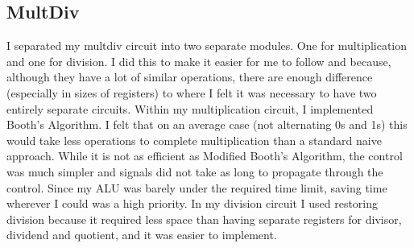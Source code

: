 \documentclass[letterpaper]{article} %
\begin{document}
\subsection*{MultDiv}
I separated my multdiv circuit into two separate modules. One for multiplication and one for division. I did this to make it easier for me to follow and because, although they have a lot of similar operations, there are enough difference (especially in sizes of registers) to where I felt it was necessary to have two entirely separate circuits. Within my multiplication circuit, I implemented Booth's Algorithm. I felt that on an average case (not alternating 0s and 1s) this would take less operations to complete  multiplication than a standard naive approach. While it is not as efficient as Modified Booth's Algorithm, the control was much simpler and signals did not take as long to propagate through the control. Since my ALU was barely under the required time limit, saving time wherever I could was a high priority. In my division circuit I used restoring division because it required less space than having separate registers for divisor, dividend and quotient, and it was easier to implement. 
\end{document}
